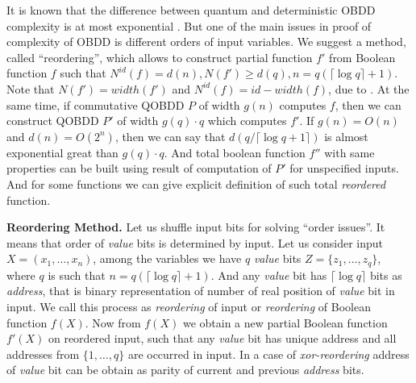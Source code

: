 \documentclass{llncs}
\begin{document}
It is known that the difference between quantum and deterministic OBDD complexity is at most exponential \cite{agkmp2005}. But one of the main issues in proof of complexity of OBDD is different orders of input variables. We suggest a method, called ``reordering'', which allows to construct partial function $f'$ from Boolean function $f$  such that $N^{id}(f)=d(n), N(f')\geq d(q),  n=q(\lceil\log q\rceil+1)$. Note that $N(f')=width(f')$ and $N^{id}(f)=id\!-\!width(f)$, due to \cite{Weg00}. At the same time, if commutative QOBDD $P$ of width $g(n)$ computes $f$, then  we can construct QOBDD $P'$ of width $g(q) \cdot q$ which computes $f'$. If $g(n)=O(n)$ and $d(n)=O(2^n)$, then we can say that $d(q/\lceil\log q +1\rceil)$ is almost exponential great than $g(q) \cdot q$. And total boolean function $f''$ with same properties can be built using  result of computation of $P'$ for unspecified inputs.
%
 And for some functions we can give explicit definition of such total {\em reordered} function.
 
{\bf Reordering Method.}
Let us shuffle input bits for solving ``order issues''. It means that order of {\em value} bits is determined by input. Let us consider input $X=(x_1,\dots,x_n)$, among the variables we have $q$ {\em value} bits $Z=\{z_1, \ldots ,z_q\}$, where $q$ is such that $n=q(\lceil\log q\rceil+1)$. And any {\em value} bit has $\lceil\log q\rceil$ bits as {\em address}, that is binary representation of number of real position of {\em value} bit in input. We call this process as {\em reordering} of input or {\em reordering} of Boolean function $f(X)$. Now from $f(X)$ we obtain a new partial Boolean function $f'(X)$ on reordered input, such that any {\em value} bit has unique address and all addresses from $\{1,\dots,q\}$ are occurred in input. In a case of {\em xor-reordering} address of {\em value} bit can be obtain as parity of current and previous {\em address} bits.  
\end{document}
